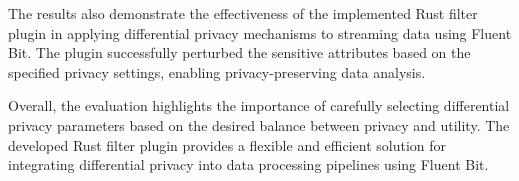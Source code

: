 The results also demonstrate the effectiveness of the implemented Rust filter plugin in applying differential privacy mechanisms to streaming data using Fluent Bit. The plugin successfully perturbed the sensitive attributes based on the specified privacy settings, enabling privacy-preserving data analysis.

Overall, the evaluation highlights the importance of carefully selecting differential privacy parameters based on the desired balance between privacy and utility. The developed Rust filter plugin provides a flexible and efficient solution for integrating differential privacy into data processing pipelines using Fluent Bit.